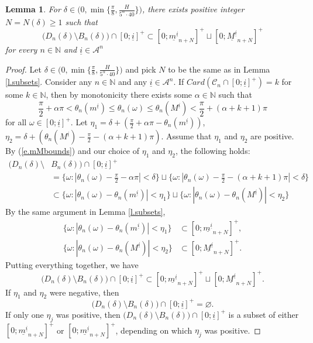 \documentclass{amsart}
\newtheorem{lemma}{Lemma}
\newcommand{\NN}{\mathbb{N}}
\newcommand{\A}{\mathcal{A}}
\newcommand{\C}{\mathcal{C}}
\begin{document}
\begin{lemma}\label{l.Dntocylinder}
    For $\delta\in \Big(0, \min\{\frac{\pi}{8}, \frac{H}{5^\alpha \cdot 40}\}\Big)$, there exists positive integer $N = N(\delta) \geq 1$ such that
    \[\Bigg(D_n(\delta) \setminus B_n(\delta)\Bigg) \cap [0;\underline{i}]^+\subset [0;\underline{m^{\underline{i}}}_{n+N}]^+ \sqcup [0;\underline{M^{\underline{i}}}_{n+N}]^+\]
    for every $n\in \NN$ and $\underline{i}\in \A^n$
\end{lemma}
\begin{proof}
    Let $\delta\in \Big(0, \min\{\frac{\pi}{8}, \frac{H}{5^\alpha \cdot 40}\}\Big)$ and pick $N$ to be the same as in Lemma \ref{l.subsets}. Consider any $n\in \NN$ and any $\underline{i}\in \A^n$. If $Card(\C_n\cap [0;\underline{i}]^+) = k$ for some $k\in \NN$, then by monotonicity there exists some $\alpha\in \NN$ such that
    \begin{equation}\label{e.mMbounds}
        \frac{\pi}{2} + \alpha\pi < \theta_n(m^{\underline{i}}) \leq \theta_n(\omega) \leq \theta_n(M^{\underline{i}}) < \frac{\pi}{2} + (\alpha + k+1)\pi
    \end{equation}
    for all $\omega\in [0;\underline{i}]^+$. Let $\eta_1 = \delta + (\frac{\pi}{2} + \alpha\pi - \theta_n(m^{\underline{i}}))$, $\eta_2 = \delta + (\theta_n(M^{\underline{i}})- \frac{\pi}{2} - (\alpha+ k+ 1) \pi)$.  Assume that $\eta_1$ and $\eta_2$ are positive. By (\ref{e.mMbounds}) and our choice of $\eta_1$ and $\eta_2$, the following holds:
    \begin{align*}
        \Bigg(D_n(\delta) \setminus& B_n(\delta)\Bigg) \cap [0;\underline{i}]^+ \\
        &= \{\omega: |\theta_n(\omega) - \frac{\pi}{2} - \alpha\pi|<\delta\} \sqcup \{\omega: |\theta_n(\omega) - \frac{\pi}{2} - (\alpha+ k+ 1)\pi|<\delta\}\\
        &\subset  \{\omega: |\theta_n(\omega) - \theta_n(m^{\underline{i}})|<\eta_1\} \sqcup \{\omega: |\theta_n(\omega) -\theta_n(M^{\underline{i}})|<\eta_2\}
    \end{align*}
    By the same argument in Lemma \ref{l.subsets},
    \begin{align*}
         \{\omega: |\theta_n(\omega) - \theta_n(m^{\underline{i}})|<\eta_1\} &\subset [0;\underline{m^{\underline{i}}}_{n+N}]^+,\\
         \{\omega: |\theta_n(\omega) -\theta_n(M^{\underline{i}})|<\eta_2\} &\subset [0;\underline{M^{\underline{i}}}_{n+N}]^+.
    \end{align*}
    Putting everything together, we have
    \[\Bigg(D_n(\delta) \setminus B_n(\delta)\Bigg) \cap [0;\underline{i}]^+ \subset [0;\underline{m^{\underline{i}}}_{n+N}]^+ \sqcup [0;\underline{M^{\underline{i}}}_{n+N}]^+.\]
    If $\eta_1$ and $\eta_2$ were negative, then 
    \[\Bigg(D_n(\delta) \setminus B_n(\delta)\Bigg) \cap [0;\underline{i}]^+ = \varnothing.\] 
    If only one $\eta_j$ was positive, then $\Big(D_n(\delta)\setminus B_n(\delta)\Big)\cap [0;\underline{i}]^+$ is a subset of either $[0;\underline{m^{\underline{i}}}_{n+N}]^+$ or $[0;\underline{m^{\underline{i}}}_{n+N}]^+$, depending on which $\eta_j$ was positive.
\end{proof}
\end{document}
